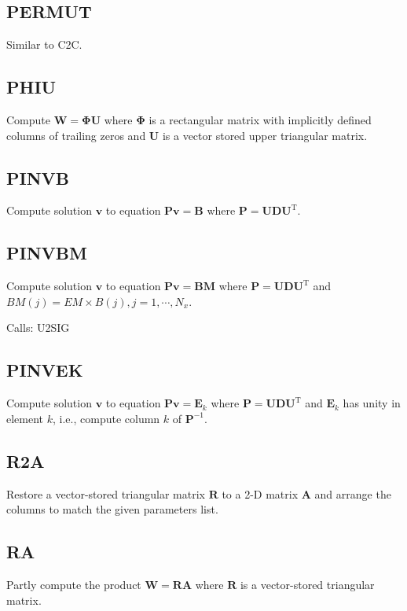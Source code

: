 \documentclass[./doc.tex]{subfiles}
\begin{document}
\subsection{PERMUT}
Similar to C2C.

\subsection{PHIU}
Compute \(\bm{W}=\bm{\Phi}\bm{U}\) where \(\bm{\Phi}\) is a rectangular matrix with implicitly
defined columns of trailing zeros and \(\bm{U}\) is a vector stored upper triangular matrix.

\subsection{PINVB}
Compute solution \(\bm{v}\) to equation \(\bm{P}\bm{v}=\bm{B}\) where \(\bm{P}=\bm{U}\bm{D}\bm{U}^{\textrm{T}}\).

\subsection{PINVBM}
Compute solution \(\bm{v}\) to equation \(\bm{P}\bm{v}=\bm{BM}\) where
\(\bm{P}=\bm{U}\bm{D}\bm{U}^{\textrm{T}}\) and \(BM(j)=EM\times B(j), j=1,\cdots, N_x\).

Calls: U2SIG

\subsection{PINVEK}
Compute solution \(\bm{v}\) to equation \(\bm{P}\bm{v}=\bm{E}_k\) where
\(\bm{P}=\bm{U}\bm{D}\bm{U}^{\textrm{T}}\) and \(\bm{E}_k\) has unity in element \(k\), i.e.,
compute column \(k\) of \(\bm{P}^{-1}\).

\subsection{R2A}
Restore a vector-stored triangular matrix \(\bm{R}\) to a 2-D matrix \(\bm{A}\) and
arrange the columns to match the given parameters list.

\subsection{RA}
Partly compute the product \(\bm{W}=\bm{R}\bm{A}\) where \(\bm{R}\) is a vector-stored triangular
matrix.
\end{document}
